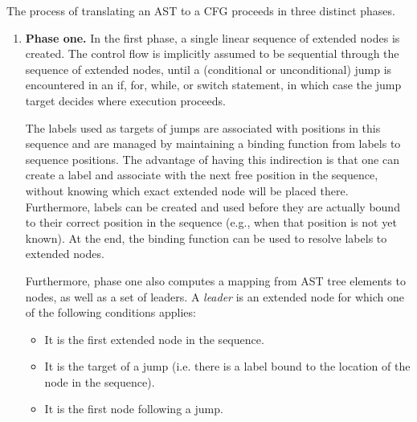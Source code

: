 

The process of translating an AST to a CFG proceeds in three distinct phases.
\begin{enumerate}
    \item \textbf{Phase one.} In the first phase, a single linear
      sequence of extended nodes is created. The control flow is
      implicitly assumed to be sequential through the sequence of
      extended nodes, until a (conditional or unconditional) jump is
      encountered in an if, for, while, or switch statement, in which
      case the jump target decides where execution proceeds.

    The labels used as targets of jumps are associated with positions
    in this sequence and are managed by maintaining a binding function
    from labels to sequence positions. The advantage of having this
    indirection is that one can create a label and associate with the
    next free position in the sequence, without knowing which exact
    extended node will be placed there.  Furthermore, labels can be
    created and used before they are actually bound to their correct
    position in the sequence (e.g., when that position is not yet
    known).  At the end, the binding function can be used to resolve
    labels to extended nodes.

    Furthermore, phase one also computes a mapping from AST tree
    elements to nodes, as well as a set of leaders. A \emph{leader} is
    an extended node for which one of the following conditions
    applies:
    \begin{itemize}
    \item It is the first extended node in the sequence.
    \item It is the target of a jump (i.e. there is a label bound to
      the location of the node in the sequence).
    \item It is the first node following a jump.
    \end{itemize}


\end{enumerate}
